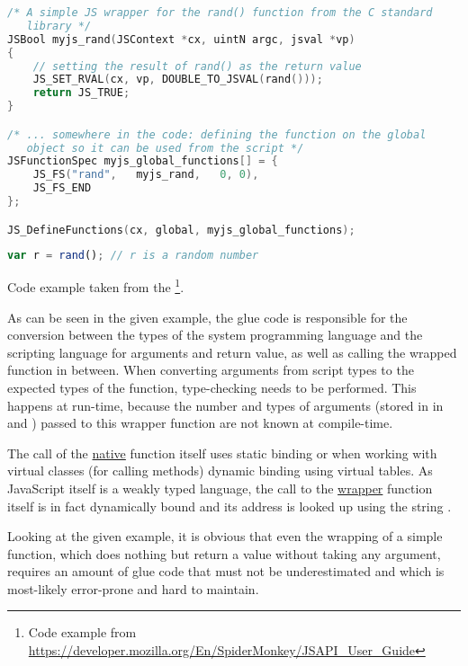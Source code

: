 \SingleSpacing
\begin{lstlisting}[language=C++, caption=Exposing a \myProperName{C} function to \myProperName{SpiderMonkey}]
/* A simple JS wrapper for the rand() function from the C standard 
   library */
JSBool myjs_rand(JSContext *cx, uintN argc, jsval *vp)
{
    // setting the result of rand() as the return value
    JS_SET_RVAL(cx, vp, DOUBLE_TO_JSVAL(rand()));
    return JS_TRUE;
}

/* ... somewhere in the code: defining the function on the global 
   object so it can be used from the script */
JSFunctionSpec myjs_global_functions[] = {
    JS_FS("rand",   myjs_rand,   0, 0),
    JS_FS_END
};

JS_DefineFunctions(cx, global, myjs_global_functions);
\end{lstlisting}
\OnehalfSpacing

\SingleSpacing
\begin{lstlisting}[language=JavaScript, caption=Using a \myProperName{C} function from \myProperName{SpiderMonkey}]
var r = rand();	// r is a random number
\end{lstlisting}
\OnehalfSpacing

Code example taken from the \footnote{Code example from \url{https://developer.mozilla.org/En/SpiderMonkey/JSAPI_User_Guide}}.

As can be seen in the given example, the glue code is responsible for the conversion between the types of the system programming language and the scripting language for arguments and return value, as well as calling the wrapped function in between. When converting arguments from script types to the expected types of the function, type-checking needs to be performed. This happens at run-time, because the number and types of arguments (stored in in  and ) passed to this wrapper function are not known at compile-time.

The call of the \underline{native} function  itself uses static binding or when working with virtual classes (for calling methods) dynamic binding using virtual tables. As JavaScript itself is a weakly typed language, the call to the \underline{wrapper} function  itself is in fact dynamically bound and its address is looked up using the string .

Looking at the given example, it is obvious that even the wrapping of a simple  function, which does nothing but return a  value without taking any argument, requires an amount of glue code that must not be underestimated and which is most-likely error-prone and hard to maintain.

